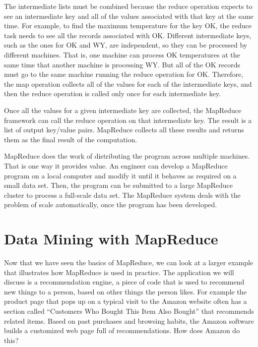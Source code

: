The intermediate lists must be combined because
the reduce operation expects to see an intermediate key and all
of the values associated with that key at the same time. For example,
to find the maximum temperature for the key \textsf{OK}, the reduce
task needs to see all the records associated with \textsf{OK}.
Different intermediate keys, such as the ones for \textsf{OK} and \textsf{WY},
are independent, so they can be processed by different machines.
That is, one machine can process \textsf{OK} temperatures at the same
time that another machine is processing \textsf{WY}.
But all of the \textsf{OK} records must go to the same machine running
the reduce operation for \textsf{OK}.
Therefore, the map operation collects all of the values for
each of the intermediate keys, and then the reduce operation is
called only once for each intermediate key.

Once all the values for a given intermediate key are
collected, the MapReduce framework can call the reduce
operation on that intermediate key.  The result is a list of
output key/value pairs. MapReduce collects all these
results and returns them as the final result of the computation.

MapReduce does the work of distributing
the program across multiple machines.
That is one way it provides value.
An engineer can develop a MapReduce program on
a local computer and modify it until it behaves as
required on a small data set.
Then, the program can be submitted to a large MapReduce cluster
to process a full-scale data set.
The MapReduce system deals with the problem of scale
automatically, once the program has been developed.

\section{Data Mining with MapReduce}

Now
that we have seen the basics of MapReduce, we can look at
a larger example that illustrates how MapReduce is
used in practice.  The application we will discuss is a recommendation engine,
a piece of code that is used to recommend new things to a person,
based on other things the person likes.
For example the product page that pops up on a typical visit to
the Amazon website often has a section called ``Customers Who Bought
This Item Also Bought'' that recommends related items.
Based on past purchases and browsing habits, the Amazon software
builds a customized web page full of recommendations.
How does Amazon do this?

